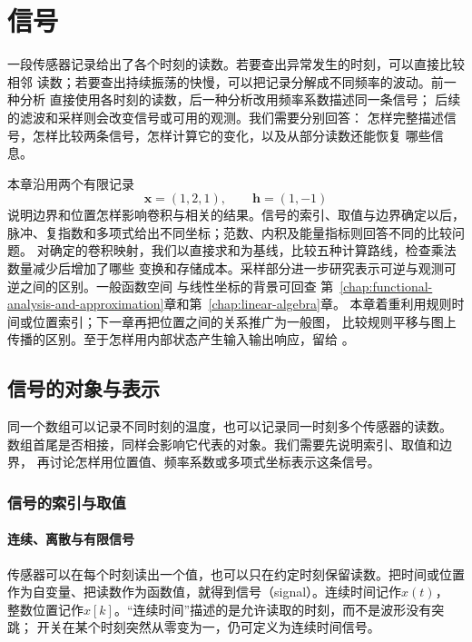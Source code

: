 \chapter{信号}
\label{chap:signal-analysis}

一段传感器记录给出了各个时刻的读数。若要查出异常发生的时刻，可以直接比较相邻
读数；若要查出持续振荡的快慢，可以把记录分解成不同频率的波动。前一种分析
直接使用各时刻的读数，后一种分析改用频率系数描述同一条信号；
后续的滤波和采样则会改变信号或可用的观测。我们需要分别回答：
怎样完整描述信号，怎样比较两条信号，怎样计算它的变化，以及从部分读数还能恢复
哪些信息。

本章沿用两个有限记录
\begin{equation}
  \bm x=(1,2,1),\qquad \bm h=(1,-1)
  \label{eq:signal-analysis-running-example}
\end{equation}
说明边界和位置怎样影响卷积与相关的结果。信号的索引、取值与边界确定以后，
脉冲、复指数和多项式给出不同坐标；范数、内积及能量指标则回答不同的比较问题。
对确定的卷积映射，我们以直接求和为基线，比较五种计算路线，检查乘法数量减少后增加了哪些
变换和存储成本。采样部分进一步研究表示可逆与观测可逆之间的区别。一般函数空间
与线性坐标的背景可回查
第~\ref{chap:functional-analysis-and-approximation}章和第~\ref{chap:linear-algebra}章。
本章着重利用规则时间或位置索引；下一章再把位置之间的关系推广为一般图，
比较规则平移与图上传播的区别。至于怎样用内部状态产生输入输出响应，留给
。

\section{信号的对象与表示}
\label{sec:signal-objects-structure}

同一个数组可以记录不同时刻的温度，也可以记录同一时刻多个传感器的读数。
数组首尾是否相接，同样会影响它代表的对象。我们需要先说明索引、取值和边界，
再讨论怎样用位置值、频率系数或多项式坐标表示这条信号。

\subsection{信号的索引与取值}

\subsubsection{连续、离散与有限信号}

传感器可以在每个时刻读出一个值，也可以只在约定时刻保留读数。把时间或位置
作为自变量、把读数作为函数值，就得到信号（signal）。连续时间记作$x(t)$，
整数位置记作$x[k]$。“连续时间”描述的是允许读取的时刻，而不是波形没有突跳；
开关在某个时刻突然从零变为一，仍可定义为连续时间信号。

